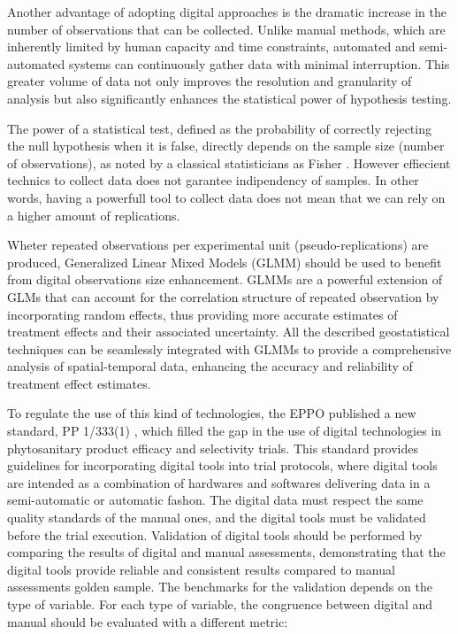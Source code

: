 \documentclass[12pt,a4paper,oneside]{report}
\begin{document}
Another advantage of adopting digital approaches is the
dramatic increase in the number of observations that can be collected. Unlike
manual methods, which are inherently limited by human capacity and time
constraints, automated and semi-automated systems can continuously gather data
with minimal interruption. This greater volume of data not only improves the
resolution and granularity of analysis but also significantly enhances the
statistical power of hypothesis testing.

The power of a statistical test, defined as the probability of correctly
rejecting the null hypothesis when it is false, directly depends on the sample
size (number of observations), as noted by a classical statisticians as
Fisher \cite{fisher_statistical_1992}. However effiecient technics
to collect data does not garantee indipendency of samples. 
In other words, having a powerfull tool to collect data does not mean that we
can rely on a higher amount of replications.

Wheter repeated observations
per experimental unit (pseudo-replications) are produced, Generalized Linear Mixed Models 
(GLMM) \cite{gbur_analysis_2020,kumle_estimating_2021}
should be used to benefit from 
digital observations size enhancement. GLMMs are a powerful extension of GLMs that can
account for the correlation structure of repeated observation
by incorporating random effects, thus providing more
accurate estimates of treatment effects and their associated uncertainty.
All the described geostatistical techniques can be seamlessly integrated with GLMMs to
provide a comprehensive analysis of spatial-temporal data, enhancing the accuracy and
reliability of treatment effect estimates.

To regulate the use of this kind of technologies, the EPPO published a new standard, 
PP 1/333(1) \cite{noauthor_span_2024}, which 
filled the gap in the use of digital technologies in phytosanitary product efficacy
and selectivity trials. This standard provides guidelines for incorporating digital
tools into trial protocols, where digital tools are intended as a combination of
hardwares and softwares delivering data 
in a semi-automatic or automatic fashon.
The digital data must respect the same quality standards of the manual
ones, and the digital tools must be validated before the trial execution.
Validation of digital tools should
be performed by comparing the results of digital and manual assessments, 
demonstrating that the digital tools provide reliable and consistent
results compared to manual assessments golden sample. 
The benchmarks for the validation depends
on the type of variable. For each type of variable, the congruence between 
digital and manual should be evaluated with a different metric:
\end{document}
